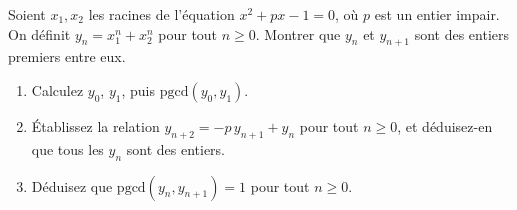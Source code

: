 Soient $x_1, x_2$ les racines de l'équation $x^2 + px - 1 = 0$, où $p$ est
un entier impair. On définit $y_n = x_1^n + x_2^n$ pour tout $n \geq 0$.
Montrer que $y_n$ et $y_{n+1}$ sont des entiers premiers entre eux.
\begin{enumerate}
  \item Calculez $y_0$, $y_1$, puis $\mathrm{pgcd}(y_0, y_1)$.
  \item Établissez la relation $y_{n+2} = -p\, y_{n+1} + y_n$ pour tout
  $n \geq 0$, et déduisez-en que tous les $y_n$ sont des entiers.
  \item Déduisez que $\mathrm{pgcd}(y_n, y_{n+1}) = 1$ pour tout $n \geq 0$.
\end{enumerate}
